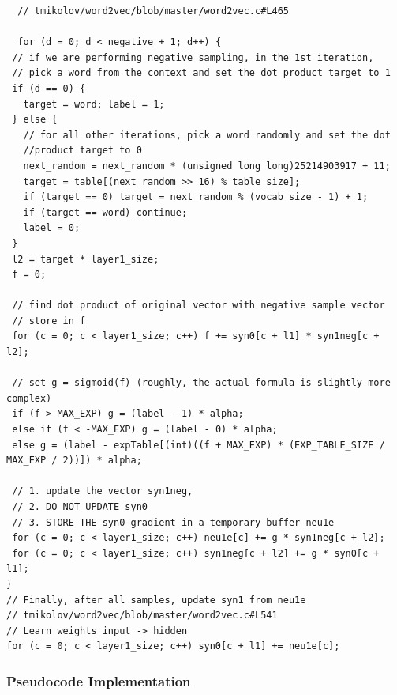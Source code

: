 \documentclass[11pt]{book}
\begin{document}

\begin{verbatim}
  // tmikolov/word2vec/blob/master/word2vec.c#L465

  for (d = 0; d < negative + 1; d++) {
 // if we are performing negative sampling, in the 1st iteration,
 // pick a word from the context and set the dot product target to 1
 if (d == 0) {
   target = word; label = 1;
 } else {
   // for all other iterations, pick a word randomly and set the dot
   //product target to 0
   next_random = next_random * (unsigned long long)25214903917 + 11;
   target = table[(next_random >> 16) % table_size];
   if (target == 0) target = next_random % (vocab_size - 1) + 1;
   if (target == word) continue;
   label = 0;
 }
 l2 = target * layer1_size;
 f = 0;

 // find dot product of original vector with negative sample vector
 // store in f
 for (c = 0; c < layer1_size; c++) f += syn0[c + l1] * syn1neg[c + l2];

 // set g = sigmoid(f) (roughly, the actual formula is slightly more complex)
 if (f > MAX_EXP) g = (label - 1) * alpha;
 else if (f < -MAX_EXP) g = (label - 0) * alpha;
 else g = (label - expTable[(int)((f + MAX_EXP) * (EXP_TABLE_SIZE / MAX_EXP / 2))]) * alpha;

 // 1. update the vector syn1neg,
 // 2. DO NOT UPDATE syn0
 // 3. STORE THE syn0 gradient in a temporary buffer neu1e
 for (c = 0; c < layer1_size; c++) neu1e[c] += g * syn1neg[c + l2];
 for (c = 0; c < layer1_size; c++) syn1neg[c + l2] += g * syn0[c + l1];
}
// Finally, after all samples, update syn1 from neu1e
// tmikolov/word2vec/blob/master/word2vec.c#L541
// Learn weights input -> hidden
for (c = 0; c < layer1_size; c++) syn0[c + l1] += neu1e[c];
\end{verbatim}

\subsubsection{Pseudocode Implementation}
\end{document}
